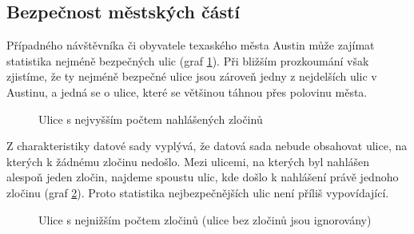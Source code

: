 \documentclass{article}
\begin{document}
\subsection{Bezpečnost městských částí}

Případného návštěvníka či obyvatele texaského města Austin může zajímat statistika nejméně
bezpečných ulic (graf \ref{fig:worst_streets}). Při bližším prozkoumání však zjistíme, že ty nejméně
bezpečné ulice jsou zároveň jedny z nejdelších ulic v Austinu, a jedná se o ulice, které se
většinou táhnou přes polovinu města.

\begin{figure}
  \centering
  \caption{Ulice s nejvyšším počtem nahlášených zločinů}
  \label{fig:worst_streets}
\end{figure}

Z charakteristiky datové sady vyplývá, že datová sada nebude obsahovat ulice, na kterých k žádnému
zločinu nedošlo. Mezi ulicemi, na kterých byl nahlášen alespoň jeden zločin, najdeme spoustu ulic,
kde došlo k nahlášení právě jednoho zločinu (graf \ref{fig:safest_streets}). Proto statistika nejbezpečnějších
ulic není příliš vypovídající.

\begin{figure}
  \centering
  \caption{Ulice s nejnižším počtem zločinů (ulice bez zločinů jsou ignorovány)}
  \label{fig:safest_streets}
\end{figure}
\end{document}
